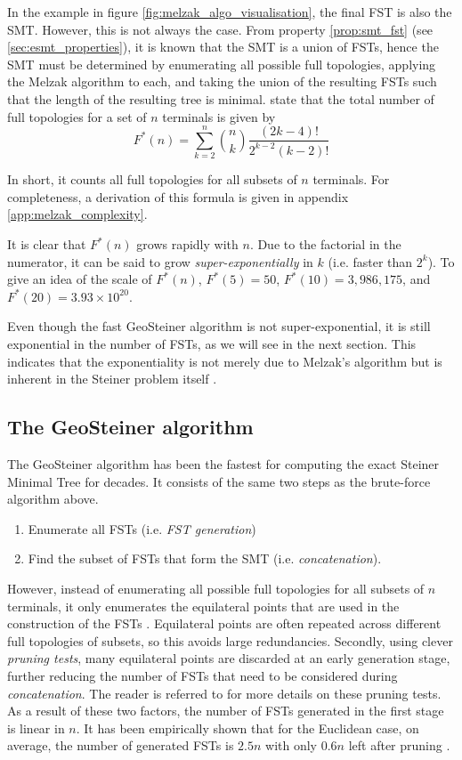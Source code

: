 \documentclass{l4proj}
\begin{document}
In the example in figure \ref{fig:melzak_algo_visualisation}, the final FST is also the SMT. However, this is not always the case. From property \ref{prop:smt_fst} (see \ref{sec:esmt_properties}), it is known that the SMT is a union of FSTs, hence the SMT must be determined by enumerating all possible full topologies, applying the Melzak algorithm to each, and taking the union of the resulting FSTs such that the length of the resulting tree is minimal. \cite{geosteiner96} state that the total number of full topologies for a set of $n$ terminals is given by
$$
    F^*(n) = \sum_{k=2}^{n} \binom{n}{k}\frac{(2k - 4)!}{2^{k-2}(k-2)!}
$$

In short, it counts all full topologies for all subsets of $n$ terminals.
For completeness, a derivation of this formula is given in appendix \ref{app:melzak_complexity}.

It is clear that $F^*(n)$ grows rapidly with $n$. Due to the factorial in the numerator, it can be said to grow \textit{super-exponentially} in $k$ (i.e. faster than $2^k$). To give an idea of the scale of $F^*(n)$, $F^*(5) = 50$, $F^*(10) = 3,986,175$, and $F^*(20) = 3.93 \times 10^{20}$.

Even though the fast GeoSteiner algorithm is not super-exponential, it is still exponential in the number of FSTs, as we will see in the next section. This indicates that the exponentiality is not merely due to Melzak's algorithm but is inherent in the Steiner problem itself \citep{Steiner_tree_problems_hwang}.

\subsection{The GeoSteiner algorithm}
The GeoSteiner algorithm has been the fastest for computing the exact Steiner Minimal Tree for decades.
It consists of the same two steps as the brute-force algorithm above.
\begin{enumerate}
    \item Enumerate all FSTs (i.e. \textit{FST generation})
    \item Find the subset of FSTs that form the SMT (i.e. \textit{concatenation}).
\end{enumerate}
However, instead of enumerating all possible full topologies for all subsets of $n$ terminals, it only enumerates the equilateral points that are used in the construction of the FSTs \citep{geosteiner96}. Equilateral points are often repeated across different full topologies of subsets, so this avoids large redundancies. Secondly, using clever \textit{pruning tests}, many equilateral points are discarded at an early generation stage, further reducing the number of FSTs that need to be considered during \textit{concatenation}. The reader is referred to \cite{geosteiner96} for more details on these pruning tests.
As a result of these two factors, the number of FSTs generated in the first stage is linear in $n$. It has been empirically shown that for the Euclidean case, on average, the number of generated FSTs is $2.5n$ with only $0.6n$ left after pruning \citep{29ee725d11ac4584b72f7fe66c4326fa}.
\end{document}
